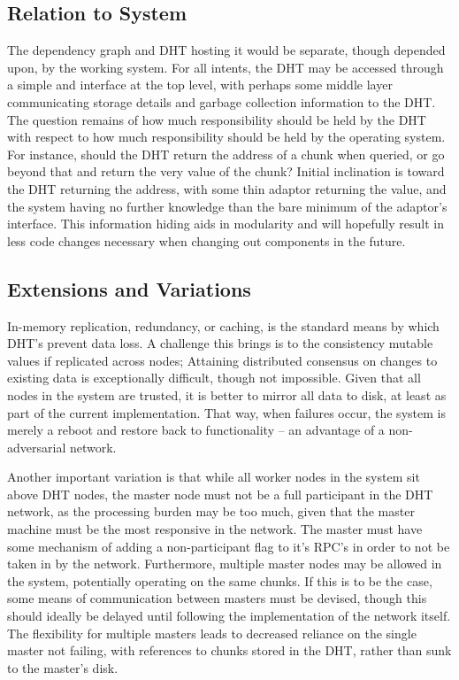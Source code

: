 \subsection{Relation to \lsr{} System}

The dependency graph and DHT hosting it would be separate, though depended upon, by the working \lsr{} system.
For all intents, the DHT may be accessed through a simple  and  interface at the top level, with perhaps some middle layer communicating storage details and garbage collection information to the DHT.
The question remains of how much responsibility should be held by the DHT with respect to how much responsibility should be held by the operating \lsr{} system.
For instance, should the DHT return the address of a chunk when queried, or go beyond that and return the very value of the chunk?
Initial inclination is toward the DHT returning the address, with some thin adaptor returning the value, and the system having no further knowledge than the bare minimum of the adaptor's interface.
This information hiding aids in modularity and will hopefully result in less code changes necessary when changing out components in the future\cite{gamma1995design}.

\subsection{Extensions and Variations}

In-memory replication, redundancy, or caching, is the standard means by which DHT's prevent data loss.
A challenge this brings is to the consistency mutable values if replicated across nodes;
Attaining distributed consensus on changes to existing data is exceptionally difficult, though not impossible\cite{brewer1999cap}\cite{gilbert2002brewer}.
Given that all nodes in the system are trusted, it is better to mirror all data to disk, at least as part of the current implementation.
That way, when failures occur, the system is merely a reboot and restore back to functionality -- an advantage of a non-adversarial network.

Another important variation is that while all worker nodes in the system sit above DHT nodes, the master node must not be a full participant in the DHT network, as the processing burden may be too much, given that the master machine must be the most responsive in the network.
The master must have some mechanism of adding a non-participant flag to it's RPC's in order to not be taken in by the network.
Furthermore, multiple master nodes may be allowed in the system, potentially operating on the same chunks.
If this is to be the case, some means of communication between masters must be devised, though this should ideally be delayed until following the implementation of the network itself.
The flexibility for multiple masters leads to decreased reliance on the single master not failing, with references to chunks stored in the DHT, rather than sunk to the master's disk.

